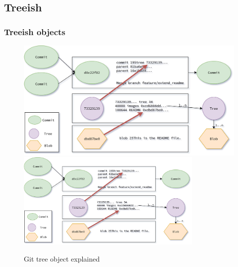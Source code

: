 \subsection{Treeish}
\begin{frame}
    \frametitle{Treeish objects}
    \begin{figure}
        \begin{center}
            {
                \includegraphics[height=0.75\textheight,keepaspectratio]{./images/Treeish.png}
            }
            {
                \includegraphics[height=0.6\textheight,width=0.8\textwidth]{./images/Treeish.png}
            }
            \caption{Git tree object explained}
        \end{center}
    \end{figure}
\end{frame}

